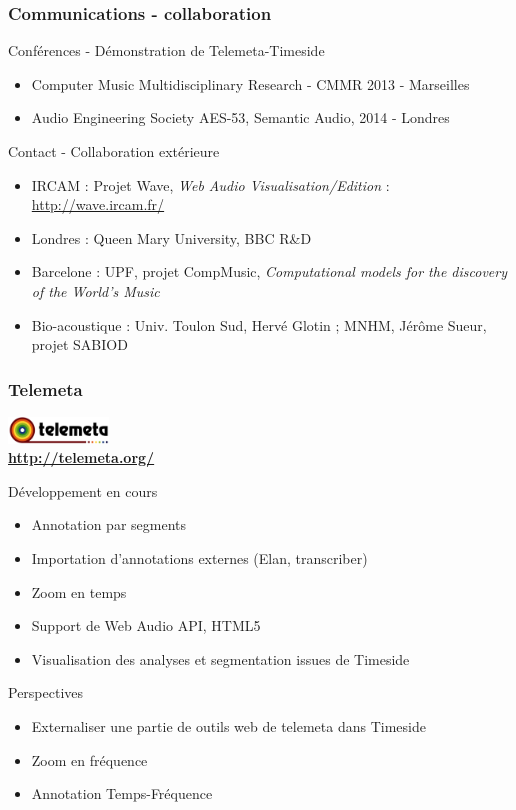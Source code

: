 \documentclass[10pt, final, hyperref, table]{beamer}
\begin{document}
\begin{frame}
\frametitle{Communications - collaboration}
\begin{block}{Conférences - Démonstration de Telemeta-Timeside}
  \begin{itemize}
  \item Computer Music Multidisciplinary Research - CMMR 2013 - Marseilles
  \item Audio Engineering Society AES-53, Semantic Audio, 2014 - Londres 
  \end{itemize}
\end{block}
\begin{block}{Contact - Collaboration extérieure}
  \begin{itemize}
  \item IRCAM : Projet Wave, \emph{Web Audio Visualisation/Edition} : \url{http://wave.ircam.fr/}
  \item Londres : Queen Mary University, BBC R\&D
  \item Barcelone : UPF, projet CompMusic, \emph{Computational models for the discovery of the World’s Music}
  \item Bio-acoustique : Univ. Toulon Sud, Hervé Glotin ; MNHM, Jérôme Sueur, projet SABIOD
  \end{itemize}
\end{block}
\end{frame}


\begin{frame}
\frametitle{Telemeta}
    \begin{flushleft}
    \includegraphics[width=0.2\textwidth]{img/logo_telemeta_1-1.pdf}\\
    \colorbox{yellow!50}{\textbf{\url{http://telemeta.org/}}}
  \end{flushleft}
  \begin{block}{Développement en cours}
    \begin{itemize}
    \item Annotation par segments
    \item Importation d'annotations externes (Elan, transcriber)
    \item Zoom en temps
    \item Support de Web Audio API, HTML5
    \item Visualisation des analyses et segmentation issues de Timeside 
    \end{itemize}
  \end{block}
  \begin{block}{Perspectives}
    \begin{itemize}
    \item Externaliser une partie de outils web de telemeta dans Timeside
    \item Zoom en fréquence
    \item Annotation Temps-Fréquence
    \end{itemize}
  \end{block}
\end{frame}
\end{document}
